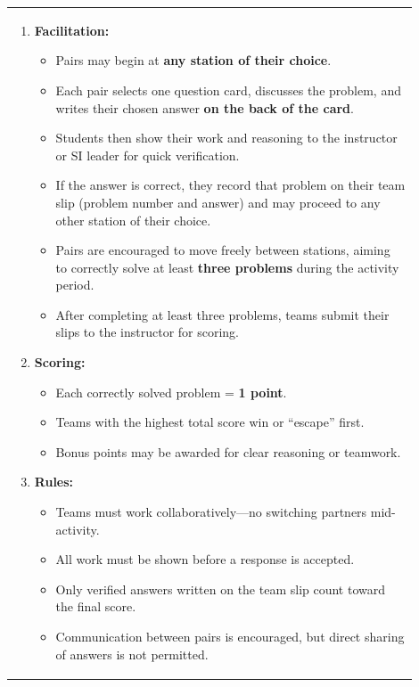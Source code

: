 \documentclass{article}
\begin{document}
{{\begin{tabular}{|p{0.9\linewidth}|}
\hline
\begin{enumerate}
    \item \textbf{Facilitation:}
    \begin{itemize}
        \item Pairs may begin at \textbf{any station of their choice}.
        \item Each pair selects one question card, discusses the problem, and writes their chosen answer \textbf{on the back of the card}.
        \item Students then show their work and reasoning to the instructor or SI leader for quick verification.
        \item If the answer is correct, they record that problem on their team slip (problem number and answer) and may proceed to any other station of their choice.
        \item Pairs are encouraged to move freely between stations, aiming to correctly solve at least \textbf{three problems} during the activity period.
        \item After completing at least three problems, teams submit their slips to the instructor for scoring.
    \end{itemize}

    \item \textbf{Scoring:}
    \begin{itemize}
        \item Each correctly solved problem = \textbf{1 point}.
        \item Teams with the highest total score win or “escape” first.
        \item Bonus points may be awarded for clear reasoning or teamwork.
    \end{itemize}

    \item \textbf{Rules:}
    \begin{itemize}
        \item Teams must work collaboratively—no switching partners mid-activity.
        \item All work must be shown before a response is accepted.
        \item Only verified answers written on the team slip count toward the final score.
        \item Communication between pairs is encouraged, but direct sharing of answers is not permitted.
    \end{itemize}


\end{enumerate}
\end{tabular}}}
\end{document}
